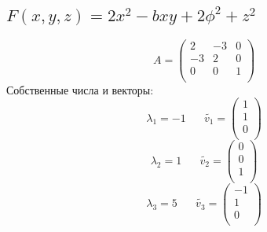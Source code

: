 \documentclass{article}
\begin{document}
    \subsection{$F(x, y, z) = 2x^2 -bxy + 2\phi^2 + z^2$}
    \begin{equation*}
    A = 
        \begin{pmatrix}
            2& -3& 0\\
            -3& 2& 0\\
            0& 0& 1\\
        \end{pmatrix}
    \end{equation*}
    Собственные числа и векторы:
    \begin{equation*}
        \lambda_1 = -1 \; \; \; \; \; \; 
        \widetilde{v_1}=
        \begin{pmatrix}
            1\\
            1\\
            0\\
        \end{pmatrix}
    \end{equation*}
    \begin{equation*}
        \lambda_2 = 1 \; \; \; \; \; \; 
        \widetilde{v_2}=
        \begin{pmatrix}
            0\\
            0\\
            1\\
        \end{pmatrix}
    \end{equation*}
    \begin{equation*}
        \lambda_3 = 5 \; \; \; \; \; \; 
        \widetilde{v_3}=
        \begin{pmatrix}
            -1\\
            1\\
            0\\
        \end{pmatrix}
    \end{equation*}
\end{document}
